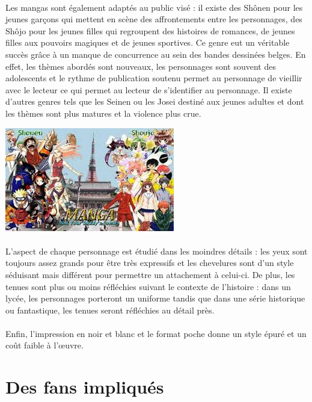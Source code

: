 \paragraph{}
Les mangas sont également adaptés au public visé : il existe des Shônen pour les jeunes garçons qui mettent en scène des affrontements entre les personnages, des Shôjo pour les jeunes filles qui regroupent des histoires de romances, de jeunes filles aux pouvoirs magiques et de jeunes sportives. Ce genre eut un véritable succès grâce à un manque de concurrence au sein des bandes dessinées belges. En effet, les thèmes abordés sont nouveaux, les personnages sont souvent des adolescents et le rythme de publication soutenu permet au personnage de vieillir avec le lecteur ce qui permet au lecteur de s’identifier au personnage. Il existe d’autres genres tels que les Seinen ou les Josei destiné aux jeunes adultes et dont les thèmes sont plus matures et la violence plus crue.
\begin{center}
\includegraphics[scale=0.8]{shojo-shonen.jpg}
\end{center}
\paragraph{}
L’aspect de chaque personnage est étudié dans les moindres détails : les yeux sont toujours assez grands pour être très expressifs et les chevelures sont d’un style séduisant mais différent pour permettre un attachement à celui-ci. De plus, les tenues sont plus ou moins réfléchies suivant le contexte de l’histoire : dans un lycée, les personnages porteront un uniforme tandis que dans une série historique ou fantastique, les tenues seront réfléchies au détail près. 
\paragraph{}
Enfin, l’impression en noir et blanc et le format poche donne un style épuré et un coût faible à l’œuvre. 

\section{Des fans impliqués}
